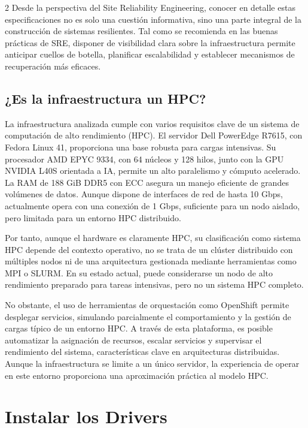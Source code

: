 \begin{multicols*}{2}
Desde la perspectiva del Site Reliability Engineering, conocer en detalle estas especificaciones no es solo una cuestión informativa, sino una parte integral de la construcción de sistemas resilientes. Tal como se recomienda en las buenas prácticas de SRE, disponer de visibilidad clara sobre la infraestructura permite anticipar cuellos de botella, planificar escalabilidad y establecer mecanismos de recuperación más eficaces.

\subsection*{¿Es la infraestructura un HPC?}

La infraestructura analizada cumple con varios requisitos clave de un sistema de computación de alto rendimiento (HPC). El servidor Dell PowerEdge R7615, con Fedora Linux 41, proporciona una base robusta para cargas intensivas. Su procesador AMD EPYC 9334, con 64 núcleos y 128 hilos, junto con la GPU NVIDIA L40S orientada a IA, permite un alto paralelismo y cómputo acelerado. La RAM de 188 GiB DDR5 con ECC asegura un manejo eficiente de grandes volúmenes de datos. Aunque dispone de interfaces de red de hasta 10 Gbps, actualmente opera con una conexión de 1 Gbps, suficiente para un nodo aislado, pero limitada para un entorno HPC distribuido.

Por tanto, aunque el hardware es claramente HPC, su clasificación como sistema HPC depende del contexto operativo, no se trata de un clúster distribuido con múltiples nodos ni de una arquitectura gestionada mediante herramientas como MPI o SLURM. En su estado actual, puede considerarse un nodo de alto rendimiento preparado para tareas intensivas, pero no un sistema HPC completo.

No obstante, el uso de herramientas de orquestación como OpenShift permite desplegar servicios, simulando parcialmente el comportamiento y la gestión de cargas típico de un entorno HPC. A través de esta plataforma, es posible automatizar la asignación de recursos, escalar servicios y supervisar el rendimiento del sistema, características clave en arquitecturas distribuidas. Aunque la infraestructura se limite a un único servidor, la experiencia de operar en este entorno proporciona una aproximación práctica al modelo HPC.


\vspace{\baselineskip}

\section{Instalar los Drivers}


\end{multicols*}
